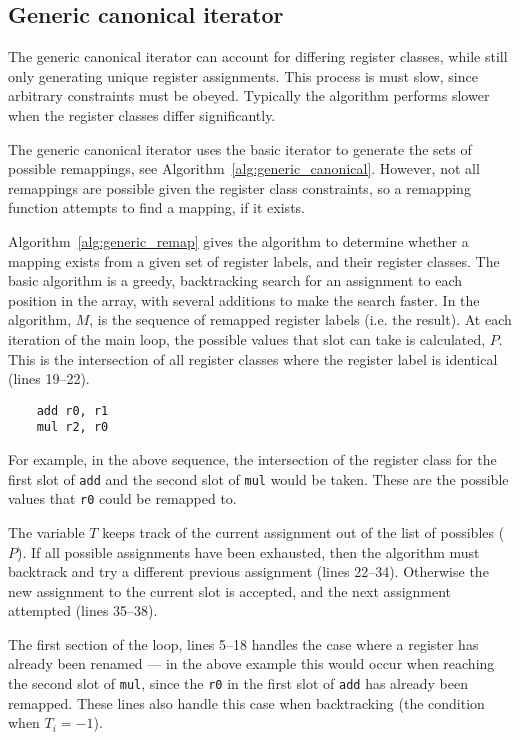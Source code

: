 \documentclass{article}
\begin{document}
\subsection{Generic canonical iterator}

The generic canonical iterator can account for differing register classes, while still only generating unique register assignments. This process is must slow, since arbitrary constraints must be obeyed. Typically the algorithm performs slower when the register classes differ significantly.

The generic canonical iterator uses the basic iterator to generate the sets of possible remappings, see Algorithm~\ref{alg:generic_canonical}. However, not all remappings are possible given the register class constraints, so a remapping function attempts to find a mapping, if it exists.

Algorithm~\ref{alg:generic_remap} gives the algorithm to determine whether a mapping exists from a given set of register labels, and their register classes. The basic algorithm is a greedy, backtracking search for an assignment to each position in the array, with several additions to make the search faster. In the algorithm, $M$, is the sequence of remapped register labels (i.e. the result). At each iteration of the main loop, the possible values that slot can take is calculated, $P$. This is the intersection of all register classes where the register label is identical (lines 19--22).

\begin{minipage}{0.3\textwidth}
\begin{verbatim}
    add r0, r1
    mul r2, r0
\end{verbatim}
\end{minipage}

For example, in the above sequence, the intersection of the register class for the first slot of \texttt{add} and the second slot of \texttt{mul} would be taken. These are the possible values that \texttt{r0} could be remapped to.

The variable $T$ keeps track of the current assignment out of the list of possibles ($P$). If all possible assignments have been exhausted, then the algorithm must backtrack and try a different previous assignment (lines 22--34). Otherwise the new assignment to the current slot is accepted, and the next assignment attempted (lines 35--38).

The first section of the loop, lines 5--18 handles the case where a register has already been renamed --- in the above example this would occur when reaching the second slot of \texttt{mul}, since the \texttt{r0} in the first slot of \texttt{add} has already been remapped. These lines also handle this case when backtracking (the condition when $T_i=-1$).
\end{document}
